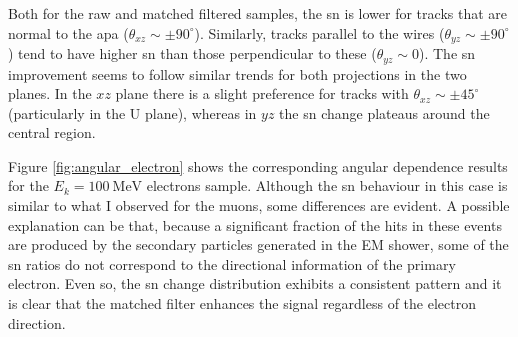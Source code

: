 Both for the raw and matched filtered samples, the \gls{sn} is lower for tracks that are normal to the \gls{apa} ($\theta_{xz} \sim \pm 90^{\circ}$). Similarly, tracks parallel to the wires ($\theta_{yz} \sim \pm 90^{\circ}$) tend to have higher \gls{sn} than those perpendicular to these ($\theta_{yz} \sim 0$). The \gls{sn} improvement seems to follow similar trends for both projections in the two planes. In the $xz$ plane there is a slight preference for tracks with $\theta_{xz} \sim \pm 45^{\circ}$ (particularly in the U plane), whereas in $yz$ the \gls{sn} change plateaus around the central region.

Figure \ref{fig:angular_electron} shows the corresponding angular dependence results for the $E_{k}=100 \ \mathrm{MeV}$ electrons sample. Although the \gls{sn} behaviour in this case is similar to what I observed for the muons, some differences are evident. A possible explanation can be that, because a significant fraction of the hits in these events are produced by the secondary particles generated in the EM shower, some of the \gls{sn} ratios do not correspond to the directional information of the primary electron. Even so, the \gls{sn} change distribution exhibits a consistent pattern and it is clear that the matched filter enhances the signal regardless of the electron direction.

